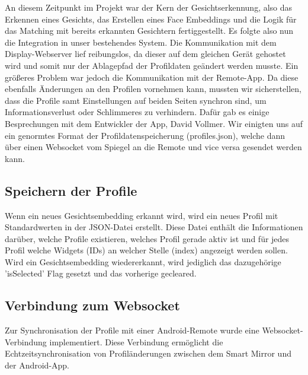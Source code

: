 An diesem Zeitpunkt im Projekt war der Kern der Gesichtserkennung, also das Erkennen eines Gesichts, das Erstellen eines Face Embeddings und die Logik für das Matching mit bereits erkannten Gesichtern fertiggestellt. Es folgte also nun die Integration in unser bestehendes System. Die Kommunikation mit dem Display-Webserver lief reibungslos, da dieser auf dem gleichen Gerät gehostet wird und somit nur der Ablagepfad der Profildaten geändert werden musste. Ein größeres Problem war jedoch die Kommunikation mit der Remote-App. Da diese ebenfalls Änderungen an den Profilen vornehmen kann, mussten wir sicherstellen, dass die Profile samt Einstellungen auf beiden Seiten synchron sind, um Informationsverlust oder Schlimmeres zu verhindern. Dafür gab es einige Besprechungen mit dem Entwickler der App, David Vollmer. Wir einigten uns auf ein genormtes Format der Profildatenspeicherung (profiles.json), welche dann über einen Websocket vom Spiegel an die Remote und vice versa gesendet werden kann.
\subsection{Speichern der Profile}
 Wenn ein neues Gesichtsembedding erkannt wird, wird ein neues Profil mit Standardwerten in der JSON-Datei erstellt. Diese Datei enthält die Informationen darüber, welche Profile existieren, welches Profil gerade aktiv ist und für jedes Profil welche Widgets (IDs) an welcher Stelle (index) angezeigt werden sollen. Wird ein Gesichtsembedding wiedererkannt, wird jediglich das dazugehörige 'isSelected' Flag gesetzt und das vorherige gecleared.


\subsection{Verbindung zum Websocket}
Zur Synchronisation der Profile mit einer Android-Remote wurde eine Websocket-Verbindung implementiert. Diese Verbindung ermöglicht die Echtzeitsynchronisation von Profiländerungen zwischen dem Smart Mirror und der Android-App.

